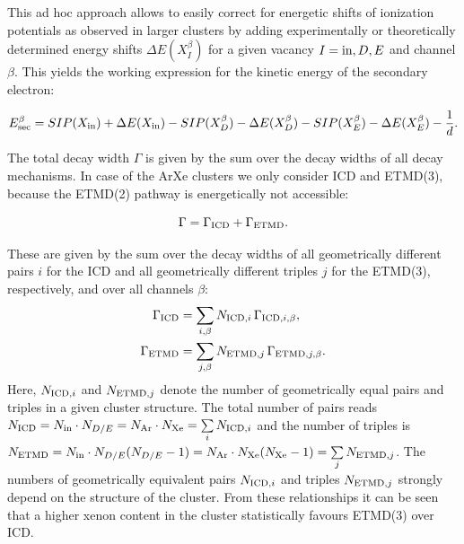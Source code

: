 \documentclass[journal=jpccck,manuscript=article]{achemso}
\begin{document}
This {\latin ad hoc} approach allows to easily correct for energetic shifts of ionization potentials as observed in larger clusters by adding experimentally or theoretically determined energy shifts $\Delta E(X_{I}^{\beta})$ for a given vacancy $I={\rm in},D,E$ and channel $\beta$. This yields the working expression for the kinetic energy of the secondary electron:

\begin{equation}
 E_{\rm sec}^\beta = SIP(X_{\rm in}) + \Delta E (X_{\rm in})
               - SIP(X_{D}^\beta) - \Delta E (X_{D}^\beta)
               - SIP(X_{E}^\beta) - \Delta E (X_{E}^\beta)
               - \frac 1d .
\end{equation}

The total decay width $\Gamma$ is given by the sum over the decay widths
of all decay mechanisms. In case of the ArXe clusters we only consider
ICD and ETMD(3), because the ETMD(2) pathway is energetically not accessible:

\begin{equation}
 \Gamma = \Gamma_{\rm ICD} + \Gamma_{\rm ETMD} .
\end{equation}

These are given by the sum over the decay widths of all 
geometrically different pairs $i$ for the
ICD and all geometrically different triples $j$ for the ETMD(3),
respectively, and over all channels $\beta$:
%
\begin{align}
 \Gamma_{\rm ICD}  &= \sum\limits_{i,\beta} N_{{\rm ICD},i}  \, \Gamma_{{\rm ICD},i,\beta},\\
 \Gamma_{\rm ETMD} &= \sum\limits_{j,\beta} N_{{\rm ETMD},j} \, \Gamma_{{\rm ETMD},j,\beta}.
\end{align}
Here, $N_{{\rm ICD},i}$ and $N_{{\rm ETMD},j}$ denote the number of geometrically
equal pairs and triples in a given cluster structure. The total number of pairs
reads
$N_{{\rm ICD}} = N_{\rm in} \cdot N_{D/E} = N_{\rm Ar} \cdot N_{\rm Xe}
 = \sum\limits_i N_{{\rm ICD},i}$ and the number of triples is
$N_{{\rm ETMD}} = N_{\rm in} \cdot N_{D/E} (N_{D/E} - 1) = N_{\rm Ar} \cdot N_{\rm Xe} (N_{\rm Xe} - 1)
 = \sum\limits_j N_{{\rm ETMD},j}$.
The numbers of geometrically equivalent pairs $N_{{\rm ICD},i}$ and triples $N_{{\rm ETMD},j}$
strongly depend on the structure of the cluster. From these relationships
it can be seen that a higher xenon content in the cluster statistically
favours ETMD(3) over ICD.
\end{document}
